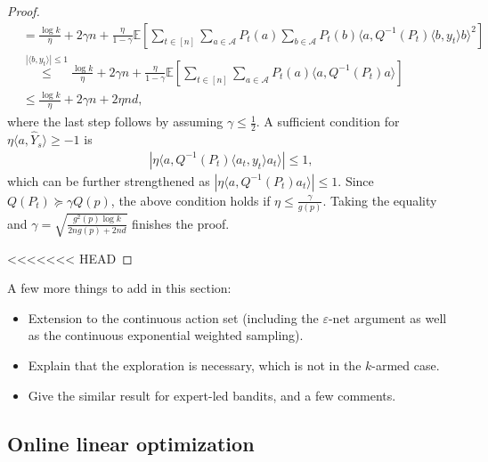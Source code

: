 \documentclass[10pt,a4article]{amsart}
\numberwithin{equation}{section}
\theoremstyle{plain}
\theoremstyle{definition}
\def\E{{\mathbb E}}
\def\e{{\varepsilon}}
\begin{document}
\begin{proof}
\begin{align*}
&= \frac{\log k}{\eta}+2\gamma n+\frac{\eta}{1-\gamma}\E\left[\sum_{t\in [n]}\sum_{a\in\mathcal A} P_t(a)\sum_{b\in\mathcal A}P_t(b)\langle a, Q^{-1}(P_t)\langle b, y_t\rangle b\rangle^2\right]\\
&\stackrel{|\langle b, y_t\rangle|\leq 1}{\leq}\frac{\log k}{\eta}+2\gamma n+\frac{\eta}{1-\gamma}\E\left[\sum_{t\in [n]}\sum_{a\in\mathcal A} P_t(a)\langle a, Q^{-1}(P_t)a\rangle\right]\\
&\leq \frac{\log k}{\eta}+2\gamma n+2\eta nd,
\end{align*}
where the last step follows by assuming $\gamma\leq\frac{1}{2}$. A sufficient condition for $\eta\langle a, \hat{Y}_s\rangle\geq -1$ is
\begin{align*}
\left|\eta\langle a, Q^{-1}(P_t)\langle a_t, y_t\rangle a_t\rangle\right|\leq 1,
\end{align*}
which can be further strengthened as $\left|\eta\langle a, Q^{-1}(P_t)a_t\rangle\right|\leq 1$. Since $Q(P_t)\succcurlyeq \gamma Q(p)$, the above condition holds if $\eta\leq \frac{\gamma}{g(p)}$. Taking the equality and $\gamma=\sqrt{\frac{g^2(p)\log k}{2ng(p)+2nd}}$ finishes the proof.   

<<<<<<< HEAD
\end{proof}


A few more things to add in this section:
\begin{itemize}
\item Extension to the continuous action set (including the $\e$-net argument as well as the continuous exponential weighted sampling). 

\item Explain that the exploration is necessary, which is not in the $k$-armed case. 

\item Give the similar result for expert-led bandits, and a few comments. 

\end{itemize}


\subsection{Online linear optimization}
\end{document}
